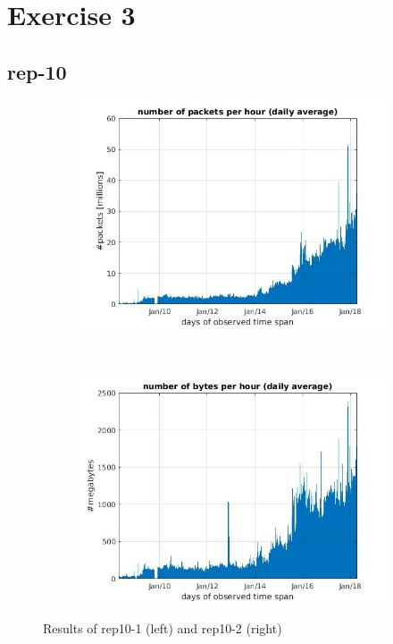 \section*{Exercise 3}

\subsection*{rep-10}
\begin{figure}[H]
\center
	\begin{subfigure}[b]{0.49\textwidth}
	\includegraphics[width=\textwidth]{./chapters/plots/rep10_1.jpg}\\
	\end{subfigure}
	~
	\begin{subfigure}[b]{0.49\textwidth}
	\includegraphics[width=\textwidth]{./chapters/plots/rep10_2.jpg}\\
	\end{subfigure}
	\caption{Results of rep10-1 (left) and rep10-2 (right)}
\end{figure}

